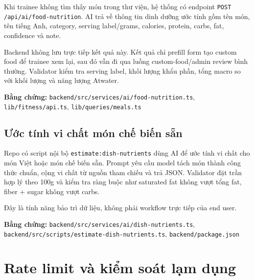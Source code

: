 \documentclass[12pt,a4paper]{article}
\newcommand{\code}[1]{\texttt{#1}}
\newcommand{\evidence}[1]{{\small\nolinkurl{#1}}}
\begin{document}
Khi trainee không tìm thấy món trong thư viện, hệ thống có endpoint \code{POST /api/ai/food-nutrition}. AI trả về thông tin dinh dưỡng ước tính gồm tên món, tên tiếng Anh, category, serving label/grams, calories, protein, carbs, fat, confidence và note.

Backend không lưu trực tiếp kết quả này. Kết quả chỉ prefill form tạo custom food để trainee xem lại, sau đó vẫn đi qua luồng custom-food/admin review bình thường. Validator kiểm tra serving label, khối lượng khẩu phần, tổng macro so với khối lượng và năng lượng Atwater.

\textbf{Bằng chứng:} \evidence{backend/src/services/ai/food-nutrition.ts}, \evidence{lib/fitness/api.ts}, \evidence{lib/queries/meals.ts}

\subsection{Ước tính vi chất món chế biến sẵn}

Repo có script nội bộ \code{estimate:dish-nutrients} dùng AI để ước tính vi chất cho món Việt hoặc món chế biến sẵn. Prompt yêu cầu model tách món thành công thức chuẩn, cộng vi chất từ nguồn tham chiếu và trả JSON. Validator đặt trần hợp lý theo 100g và kiểm tra ràng buộc như saturated fat không vượt tổng fat, fiber + sugar không vượt carbs.

Đây là tính năng bảo trì dữ liệu, không phải workflow trực tiếp của end user.

\textbf{Bằng chứng:} \evidence{backend/src/services/ai/dish-nutrients.ts}, \evidence{backend/src/scripts/estimate-dish-nutrients.ts}, \evidence{backend/package.json}

\section{Rate limit và kiểm soát lạm dụng}
\end{document}
